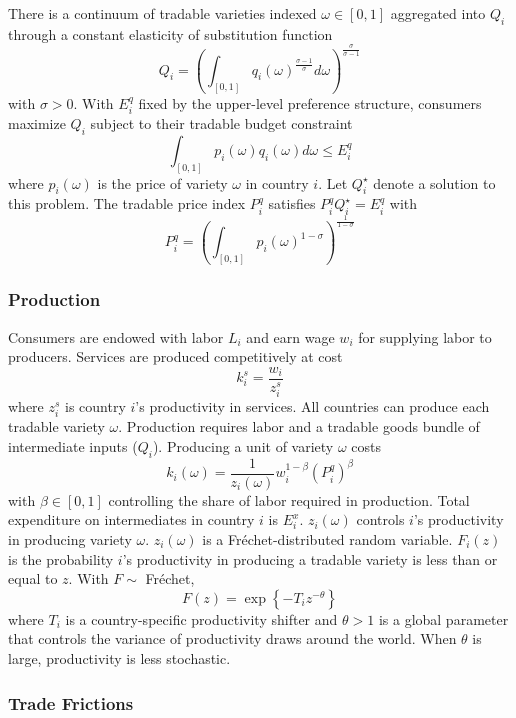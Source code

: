 \documentclass{puthesis}
\begin{document}
There is a continuum of tradable varieties indexed \(\omega \in [0,1]\)
aggregated into \(Q_i\) through a constant elasticity of substitution
function \begin{equation} \label{eq:CES}
Q_i = \left( \int_{[0,1]} q_i(\omega)^{\frac{\sigma - 1}{\sigma}} d \omega  \right)^{\frac{\sigma}{\sigma - 1}}
\end{equation} with \(\sigma > 0\). With \(E_i^q\) fixed by the
upper-level preference structure, consumers maximize \(Q_i\) subject to
their tradable budget constraint \[
\int_{[0,1]} p_i(\omega) q_i(\omega) d \omega \leq E_i^q
\] where \(p_i(\omega)\) is the price of variety \(\omega\) in country
\(i\). Let \(Q_i^\star\) denote a solution to this problem. The tradable
price index \(P_i^q\) satisfies \(P_i^q Q_i^\star = E_i^q\) with \[
P_i^q = \left( \int_{[0,1]} p_i(\omega)^{1 - \sigma} \right)^{\frac{1}{1 - \sigma}}
\]

\subsubsection{Production}

Consumers are endowed with labor \(L_i\) and earn wage \(w_i\) for
supplying labor to producers. Services are produced competitively at
cost \[
k_i^s = \frac{w_i}{z_i^s}
\] where \(z_i^s\) is country \(i\)'s productivity in services. All
countries can produce each tradable variety \(\omega\). Production
requires labor and a tradable goods bundle of intermediate inputs
(\(Q_i\)). Producing a unit of variety \(\omega\) costs \[
k_i(\omega) = \frac{1}{z_i(\omega)} w_i^{1 - \beta} \left( P_i^q \right)^\beta
\] with \(\beta \in [0,1]\) controlling the share of labor required in
production. Total expenditure on intermediates in country \(i\) is
\(E_i^x\). \(z_i(\omega)\) controls \(i\)'s productivity in producing
variety \(\omega\). \(z_i(\omega)\) is a Fréchet-distributed random
variable. \(F_i(z)\) is the probability \(i\)'s productivity in
producing a tradable variety is less than or equal to \(z\). With
\(F \sim\) Fréchet, \[
F(z) = \exp \left\{ - T_i z^{-\theta} \right\}
\] where \(T_i\) is a country-specific productivity shifter and
\(\theta > 1\) is a global parameter that controls the variance of
productivity draws around the world. When \(\theta\) is large,
productivity is less stochastic.

\subsubsection{Trade Frictions}
\end{document}
